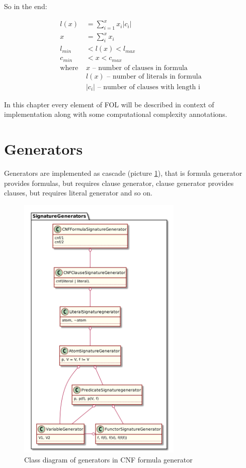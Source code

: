 So in the end:

\begin{align}
	l(x) &= \sum_{i=1}^{x} x_i |c_i| \\
	x &= \sum_i^x x_i \\
	l_{min} &< l(x) < l_{max} \\
	c_{min} &< x < c_{max} \\
	\text{where } 
		&x \text{ -- number of clauses in formula} \nonumber \\
		&l(x) \text{ -- number of literals in formula} \nonumber  \\
		&|c_i| \text{ -- number of clauses with length i} \nonumber
\end{align}

In this chapter every element of \gls{FOL} will be described in context of implementation along with some computational complexity annotations.


\section{Generators}
\label{sec:Generators}

Generators are implemented as cascade (picture \ref{pic:fol_signature_generator_class_diagram}), that is formula generator provides formulas, but requires clause generator, clause generator provides clauses, but requires literal generator and so on.

\begin{figure}[h]
\begin{centering}
  \includegraphics[width=0.7\textwidth]{logic-formula-generator/fol/cnf_signature_generators.png}
  \caption{Class diagram of generators in CNF formula generator}
  \label{pic:fol_signature_generator_class_diagram}
\end{centering}
\end{figure}

